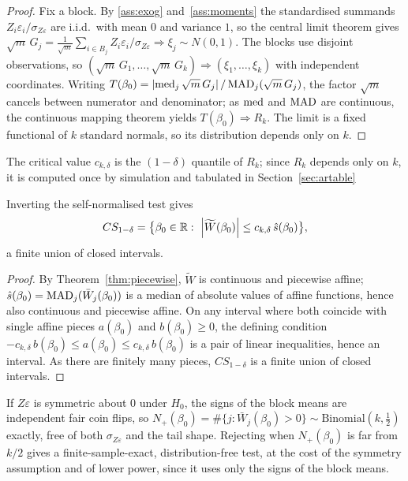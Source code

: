 \begin{proof}
    Fix a block. By \ref{ass:exog} and~\ref{ass:moments} the standardised summands $Z_i\varepsilon_i/\sigma_{Z\varepsilon}$ are i.i.d.\ with mean $0$ and variance $1$, so the central limit theorem gives $\sqrt{m}\,G_j=\tfrac{1}{\sqrt{m}}\sum_{i\in B_j}Z_i\varepsilon_i/\sigma_{Z\varepsilon} \Rightarrow\xi_j\sim N(0,1)$. The blocks use disjoint observations, so $(\sqrt{m}\,G_1,\dots,\sqrt{m}\,G_k)\Rightarrow(\xi_1,\dots,\xi_k)$ with independent coordinates. Writing $T(\beta_0)=\left|\operatorname{med}_j\sqrt{m}\,G_j\right|/\operatorname{MAD}_j(\sqrt{m}\,G_j)$, the factor $\sqrt{m}$ cancels between numerator and denominator; as $\operatorname{med}$ and $\operatorname{MAD}$ are continuous, the continuous mapping theorem yields $T(\beta_0)\Rightarrow R_k$. The limit is a fixed functional of $k$ standard normals, so its distribution depends only on $k$.
\end{proof}

The critical value $c_{k,\delta}$ is the $(1-\delta)$ quantile of $R_k$; since $R_k$ depends only on $k$, it is computed once by simulation and tabulated in Section~\ref{sec:artable}


\begin{corollary} \label{cor:sn_cs} 
  Inverting the self-normalised test gives \[ CS_{1-\delta}=\bigl\{\beta_0\in\R:\ \abs{\widetilde{W}(\beta_0)} \le c_{k,\delta}\,\hat{s}(\beta_0)\bigr\}, \] a finite union of closed intervals.
\end{corollary}

\begin{proof}
  By Theorem~\ref{thm:piecewise}, $\widetilde{W}$ is continuous and piecewise affine; $\hat{s}(\beta_0)=\operatorname{MAD}_j(\bar{W}_j(\beta_0))$ is a median of absolute values of affine functions, hence also continuous and piecewise affine. On any interval where both coincide with single affine pieces $a(\beta_0)$ and $b(\beta_0)\ge0$, the defining condition $-c_{k,\delta}\,b(\beta_0)\le a(\beta_0)\le c_{k,\delta}\, b(\beta_0)$ is a pair of linear inequalities, hence an interval. As there are finitely many pieces, $CS_{1-\delta}$ is a finite union of closed intervals.
\end{proof}

\begin{remark} \label{rem:sn_sign} If $Z\varepsilon$ is symmetric about $0$ under $H_0$, the signs of the block means are independent fair coin flips, so $N_+(\beta_0)=\#\{j: \bar{W}_j(\beta_0)>0\}\sim\mathrm{Binomial}(k,\tfrac12)$ exactly, free of both $\sigma_{Z\varepsilon}$ and the tail shape. Rejecting when $N_+(\beta_0)$ is far from $k/2$ gives a finite-sample-exact, distribution-free test, at the cost of the symmetry assumption and of lower power, since it uses only the signs of the block means. \end{remark}

